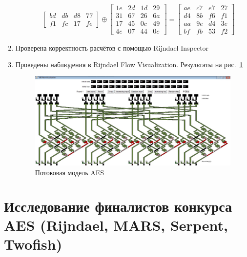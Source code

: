 \documentclass[a4paper, 14pt]{extarticle}
\begin{document}
\begin{enumerate}
\begin{enumerate}
\begin{equation}
\begin{split}
\begin{bmatrix}
                        bd & db & d8 & 77 \\
                        f1 & fc & 17 & fe
                    \end{bmatrix} \oplus \begin{bmatrix}
                1e & 2d & 1d & 29 \\
                31 & 67 & 26 & 6a \\
                17 & 45 & 0c & 49 \\
                4e & 07 & 44 & 0c
            \end{bmatrix} = \begin{bmatrix}
                ae & c7 & e7 & 27 \\
                d4 & 8b & f6 & f1 \\
                aa & 9e & d4 & 3e \\
                bf & fb & 53 & f2
            \end{bmatrix}
        \end{split}
        \end{equation}
    \end{enumerate}
    \item Проверена корректность расчётов с помощью Rijndael Inspector
    \item Проведены наблюдения в Rijndael Flow Visualization. Результаты  на рис.~\ref{img:a:1}
    \begin{figure}[h]
        \centering
        \includegraphics[width=\textheight,angle=90]{img/S013.jpg}
        \caption{Потоковая модель AES}%
        \label{img:a:1}
    \end{figure}
    
\end{enumerate}
\FloatBarrier{}
\section{Исследование финалистов конкурса AES (Rijndael, MARS, Serpent, Twofish)}
\end{document}
